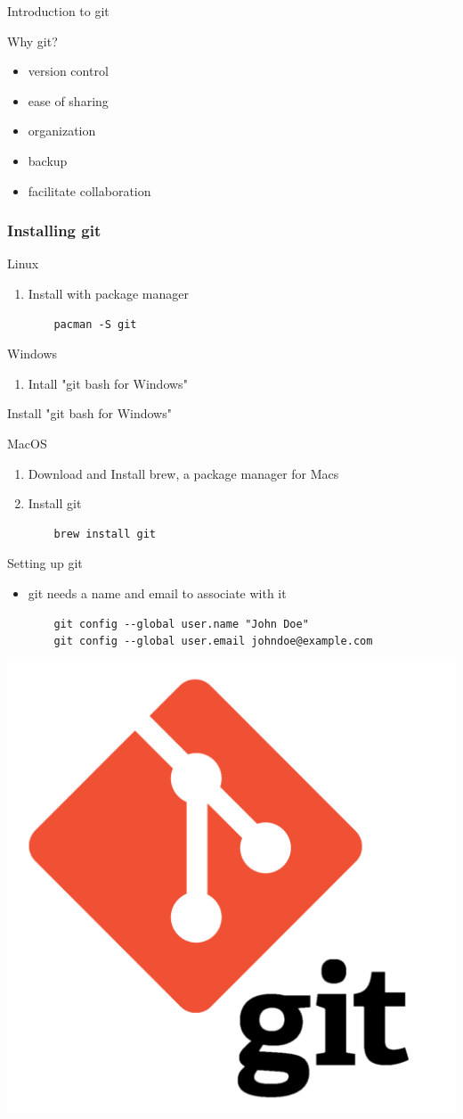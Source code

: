 \documentclass[t]{beamer}
\begin{document}
\begin{frame}{Introduction to git}

Why git?
\begin{itemize}
    \item version control
    \item ease of sharing 
    \item organization
    \item backup
    \item facilitate collaboration
\end{itemize}



\end{frame}

\begin{frame}[fragile]
\frametitle{Installing git}
Linux
\begin{enumerate}
    \item Install with package manager
    \begin{verbatim}
    pacman -S git
    \end{verbatim}
\end{enumerate}

Windows
\begin{enumerate}
    \item Intall "git bash for Windows"
\end{enumerate}
\item Install "git bash for Windows"

MacOS
\begin{enumerate}
    \item Download and Install brew, a package manager for Macs

    \item Install git
    \begin{verbatim}
    brew install git
    \end{verbatim}
\end{enumerate}

\end{frame}

\begin{frame}[fragile]{Setting up git}

\begin{itemize}
    \item git needs a name and email to associate with it
    \begin{verbatim}
    git config --global user.name "John Doe"
    git config --global user.email johndoe@example.com
    \end{verbatim}
    \vspace*{\fill}
\end{itemize}
\begin{center}
    \includegraphics[width = .2\textwidth]{gitlogo}
\end{center}

    
\end{frame}
\end{document}
